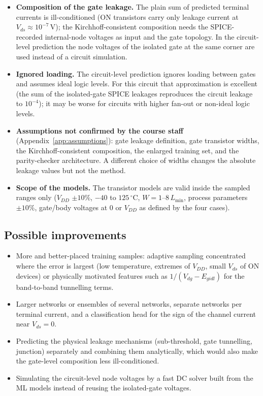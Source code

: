 \begin{itemize}
  \item \textbf{Composition of the gate leakage.} The plain sum of predicted terminal currents is ill-conditioned (ON transistors carry only leakage current at $V_{ds}\approx10^{-7}$\,V); the Kirchhoff-consistent composition needs the SPICE-recorded internal-node voltages as input and the gate topology. In the circuit-level prediction the node voltages of the isolated gate at the same corner are used instead of a circuit simulation.
  \item \textbf{Ignored loading.} The circuit-level prediction ignores loading between gates and assumes ideal logic levels. For this circuit that approximation is excellent (the sum of the isolated-gate SPICE leakages reproduces the circuit leakage to $10^{-4}$); it may be worse for circuits with higher fan-out or non-ideal logic levels.
  \item \textbf{Assumptions not confirmed by the course staff} (Appendix~\ref{app:assumptions}): gate leakage definition, gate transistor widths, the Kirchhoff-consistent composition, the enlarged training set, and the parity-checker architecture. A different choice of widths changes the absolute leakage values but not the method.
  \item \textbf{Scope of the models.} The transistor models are valid inside the sampled ranges only ($V_{DD}$ $\pm10\%$, $-40$ to $125\,^\circ$C, $W=1$--$8\,L_{\min}$, process parameters $\pm10\%$, gate/body voltages at $0$ or $V_{DD}$ as defined by the four cases).
\end{itemize}

\subsection{Possible improvements}
\begin{itemize}
  \item More and better-placed training samples: adaptive sampling concentrated where the error is largest (low temperature, extremes of $V_{DD}$, small $V_{ds}$ of ON devices) or physically motivated features such as $1/(V_{dg}-E_{gidl})$ for the band-to-band tunnelling terms.
  \item Larger networks or ensembles of several networks, separate networks per terminal current, and a classification head for the sign of the channel current near $V_{ds}=0$.
  \item Predicting the physical leakage mechanisms (sub-threshold, gate tunnelling, junction) separately and combining them analytically, which would also make the gate-level composition less ill-conditioned.
  \item Simulating the circuit-level node voltages by a fast DC solver built from the ML models instead of reusing the isolated-gate voltages.
\end{itemize}
